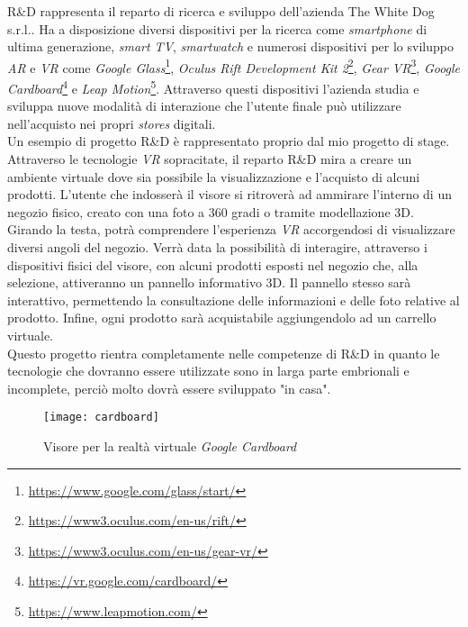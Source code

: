 R\&D rappresenta il reparto di ricerca e sviluppo dell'azienda The White Dog s.r.l..
Ha a disposizione diversi dispositivi per la ricerca come \textit{smartphone} di ultima generazione, \textit{smart TV}, \textit{smartwatch} e numerosi dispositivi per lo sviluppo \textit{AR} e \textit{VR} come \textit{Google Glass}\footnote[11]{\url{https://www.google.com/glass/start/}}, \textit{Oculus Rift Development Kit 2}\footnote[12]{\url{https://www3.oculus.com/en-us/rift/}}, \textit{Gear VR}\footnote[13]{\url{https://www3.oculus.com/en-us/gear-vr/}}, \textit{Google Cardboard}\footnote[14]{\url{https://vr.google.com/cardboard/}} e \textit{Leap Motion}\footnote[15]{\url{https://www.leapmotion.com/}}. Attraverso questi dispositivi l'azienda studia e sviluppa nuove modalità di interazione che l'utente finale può utilizzare nell'acquisto nei propri \textit{stores} digitali. \\
Un esempio di progetto R\&D è rappresentato proprio dal mio progetto di stage. Attraverso le tecnologie \textit{VR} sopracitate, il reparto R\&D mira a creare un ambiente virtuale dove sia possibile la visualizzazione e l'acquisto di alcuni prodotti. L'utente che indosserà il visore si ritroverà ad ammirare l'interno di un negozio fisico, creato con una foto a 360 gradi o tramite modellazione 3D. Girando la testa, potrà comprendere l'esperienza \textit{VR} accorgendosi di visualizzare diversi angoli del negozio. Verrà data la possibilità di interagire, attraverso i dispositivi fisici del visore, con alcuni prodotti esposti nel negozio che, alla selezione, attiveranno un pannello informativo 3D. Il pannello stesso sarà interattivo, permettendo la consultazione delle informazioni e delle foto relative al prodotto. Infine, ogni prodotto sarà acquistabile aggiungendolo ad un carrello virtuale. \\
Questo progetto rientra completamente nelle competenze di R\&D in quanto le tecnologie che dovranno essere utilizzate sono in larga parte embrionali e incomplete, perciò molto dovrà essere sviluppato "in casa".

\label{Google Cardboard}
\begin{figure}[ht]
	\begin{center}
		\texttt{[image: cardboard]}
		\hypertarget{gc}{\caption{Visore per la realtà virtuale \textit{Google Cardboard}}}
	\end{center}
\end{figure}
\FloatBarrier